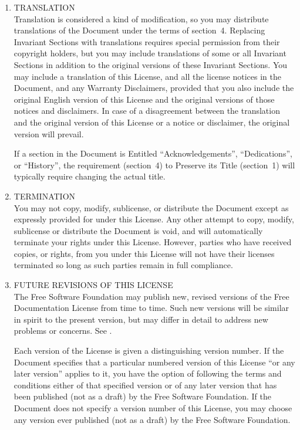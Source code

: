 \begin{enumerate}
\item
  TRANSLATION \\
  Translation is considered a kind of modification, so you may distribute translations of the
  Document under the terms of section~4.  Replacing Invariant Sections with translations
  requires special permission from their copyright holders, but you may include translations of
  some or all Invariant Sections in addition to the original versions of these Invariant
  Sections.  You may include a translation of this License, and all the license notices in the
  Document, and any Warranty Disclaimers, provided that you also include the original English
  version of this License and the original versions of those notices and disclaimers.  In case
  of a disagreement between the translation and the original version of this License or a notice
  or disclaimer, the original version will prevail.

  If a section in the Document is Entitled ``Acknowledgements'',
  ``Dedications'', or ``History'', the requirement (section~4) to
  Preserve its Title (section~1) will typically require changing the
  actual title.

\item
  TERMINATION \\
  You may not copy, modify, sublicense, or distribute the Document except as expressly provided
  for under this License.  Any other attempt to copy, modify, sublicense or distribute the
  Document is void, and will automatically terminate your rights under this License.  However,
  parties who have received copies, or rights, from you under this License will not have their
  licenses terminated so long as such parties remain in full compliance.

\item
  FUTURE REVISIONS OF THIS LICENSE \\
  The Free Software Foundation may publish new, revised versions of the  Free
  Documentation License from time to time.  Such new versions will be similar in spirit to the
  present version, but may differ in detail to address new problems or concerns.  See
  .

  Each version of the License is given a distinguishing version number.  If the Document
  specifies that a particular numbered version of this License ``or any later version'' applies
  to it, you have the option of following the terms and conditions either of that specified
  version or of any later version that has been published (not as a draft) by the Free Software
  Foundation.  If the Document does not specify a version number of this License, you may choose
  any version ever published (not as a draft) by the Free Software Foundation.
\end{enumerate}



